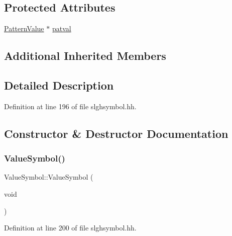 \subsection*{Protected Attributes}
\begin{DoxyCompactItemize}
\item 
\mbox{\hyperlink{class_pattern_value}{Pattern\+Value}} $\ast$ \mbox{\hyperlink{class_value_symbol_a816cbca7518de0d1d23220ff443d8189}{patval}}
\end{DoxyCompactItemize}
\subsection*{Additional Inherited Members}


\subsection{Detailed Description}


Definition at line 196 of file slghsymbol.\+hh.



\subsection{Constructor \& Destructor Documentation}
\mbox{\label{class_value_symbol_a2286e5135aa61b94d70dbc9aa2838e13}} 
\subsubsection{\texorpdfstring{ValueSymbol()}{ValueSymbol()}\hspace{0.1cm}{\footnotesize\ttfamily [1/2]}}
{\footnotesize\ttfamily Value\+Symbol\+::\+Value\+Symbol (\begin{DoxyParamCaption}\item[{void}]{ }\end{DoxyParamCaption})\hspace{0.3cm}{\ttfamily [inline]}}



Definition at line 200 of file slghsymbol.\+hh.

\mbox{\label{class_value_symbol_a62f46fb6b06d7a923521f84a8d32c684}} 
